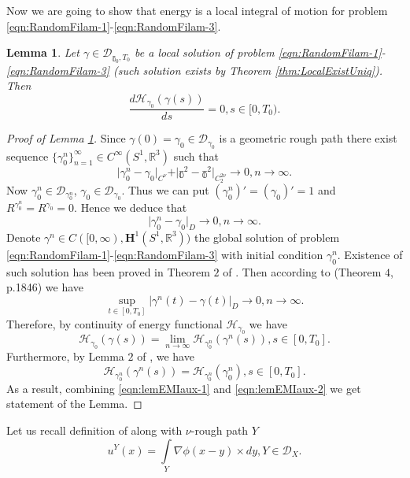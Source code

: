 \documentclass[11pt,a4paper,leqno]{amsart}%
\theoremstyle{plain}
\theoremstyle{remark}
\theoremstyle{plain}
\newtheorem{lemma}[theorem]{Lemma}
\numberwithin{equation}{section}
\def\Rnu{{\mathbb R}}
\def\liml{\lim\limits}
\def\supl{\sup\limits}
\def\intl{\int\limits}
\def\supl{\mathop{\sup}\limits}
\begin{document}
Now we are going to show that energy is a local integral of motion
for problem \eqref{eqn:RandomFilam-1}-\eqref{eqn:RandomFilam-3}.
\begin{lemma}\label{lem:EnergyMotionIntegral}
Let $\gamma\in\mathcal{D}_{\mathbb{\gamma}_0,T_0}$ be a local solution of
problem \eqref{eqn:RandomFilam-1}-\eqref{eqn:RandomFilam-3} (such
solution exists by Theorem \ref{thm:LocalExistUniq}). Then
$$
\frac{d\mathcal{H}_{\gamma_0}(\gamma(s))}{ds}=0,s\in[0,T_0).
$$
\end{lemma}
\begin{proof}[Proof of Lemma \ref{lem:EnergyMotionIntegral}]
Since $\gamma(0)=\gamma_0\in \mathcal{D}_{\gamma_0}$ is a geometric rough path
there exist sequence $\{\gamma_0^n\}_{n=1}^{\infty}\in C^{\infty}(S^1,\Rnu^3)$ such that
\[
\vert \gamma_0^n-\gamma_0\vert_{C^{\nu}}+\vert \mathbb{\gamma}^2-\mathbb{\gamma}^2\vert_{C_2^{2\nu}}\to 0,n\to\infty.
\]
Now $\gamma_0^n\in \mathcal{D}_{\gamma_0^n}$, $\gamma_0\in \mathcal{D}_{\gamma_0}$. Thus we can put
$(\gamma_0^n)'=(\gamma_0)'=1$ and $R^{\gamma_0^n}=R^{\gamma_0}=0$.
Hence we deduce that
$$
\vert \gamma_0^n-\gamma_0\vert_D\to 0,n\to\infty.
$$
Denote $\gamma^n\in C([0,\infty),\mathbf{H}^1(S^1,\Rnu^3))$ the
global solution of problem
\eqref{eqn:RandomFilam-1}-\eqref{eqn:RandomFilam-3} with initial
condition $\gamma_0^n$. Existence of such solution has been proved in
Theorem $2$ of \cite{[Bers+Gub_2007]}. Then according to
\cite{[Bers+Gub_2007]} (Theorem $4$, p.1846) we have
$$
\supl_{t\in[0,T_0]}\vert \gamma^n(t)-\gamma(t)\vert_D\to 0,n\to\infty.
$$
Therefore, by continuity of energy functional $\mathcal{H}_{\gamma_0}$ we
have
\begin{equation}
\mathcal{H}_{\gamma_0}(\gamma(s))=\liml_{n\to\infty}\mathcal{H}_{\gamma_0^n}(\gamma^n(s)),s\in[0,T_0].\label{eqn:lemEMIaux-1}
\end{equation}
Furthermore, by Lemma $2$ of \cite{[Bers+Gub_2007]}, we
have
\begin{equation}
\mathcal{H}_{\gamma_0^n}(\gamma^n(s))=\mathcal{H}_{\gamma_0^n}(\gamma_0^n),s\in[0,T_0].\label{eqn:lemEMIaux-2}
\end{equation}
As a result, combining \eqref{eqn:lemEMIaux-1} and
\eqref{eqn:lemEMIaux-2} we get statement of the Lemma.
\end{proof}
Let us recall definition of along with $\nu$-rough path $Y$
\begin{equation}
u^Y(x)=\intl_Y\nabla\phi(x-y)\times dy,Y\in
\mathcal{D}_X.\label{eqn:RandomFilam-3'}
\end{equation}
\end{document}
